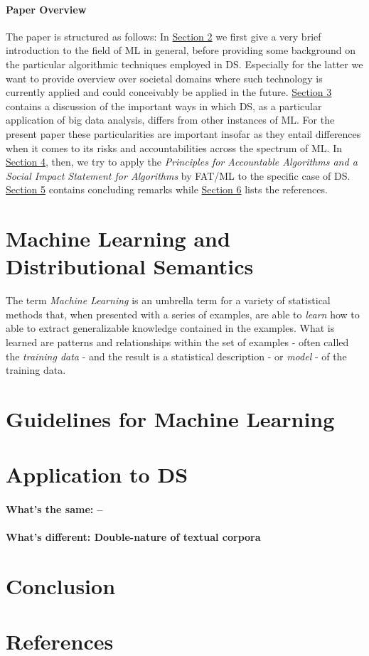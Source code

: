 \documentclass{article}
\begin{document}
\paragraph{Paper Overview}
The paper is structured as follows: In \hyperlink{sec2}{Section 2} we first give a very brief introduction to the field of ML in general, before providing some background on the particular algorithmic techniques employed in DS. Especially for the latter we want to provide overview over societal domains where such technology is currently applied and could conceivably be applied in the future. \hyperlink{sec3}{Section 3} contains a discussion of the important ways in which DS, as a particular application of big data analysis, differs from other instances of ML. For the present paper these particularities are important insofar as they entail differences when it comes to its risks and accountabilities across the spectrum of ML. In \hyperlink{sec4}{Section 4}, then, we try to apply the \emph{Principles for Accountable Algorithms and a Social Impact Statement for Algorithms} by FAT/ML to the specific case of DS. \hyperlink{sec5}{Section 5} contains concluding remarks while \hyperlink{sec6}{Section 6} lists the references.
\section{Machine Learning and Distributional Semantics}\hypertarget{sec3}{ }
The term \emph{Machine Learning} is an umbrella term for a variety of statistical methods that, when presented with a series of examples, are able to \emph{learn} how to able to extract generalizable knowledge contained in the examples. What is learned are patterns and relationships within the set of examples - often called the \emph{training data} - and the result is a statistical description - or \emph{model} - of the training data. \cite{fayyad2001digital}  
\section{Guidelines for Machine Learning}\hypertarget{sec2}{}

\section{Application to DS}\hypertarget{sec4}{ }
\paragraph{What's the same: --}
\paragraph{What's different: Double-nature of textual corpora}
\section{Conclusion}

\section{References}\hypertarget{sec5}{ }
\end{document}
